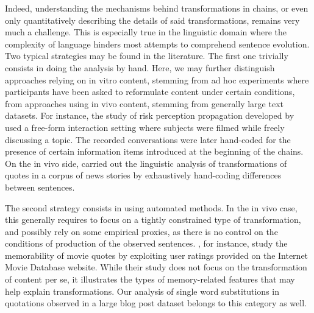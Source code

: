 Indeed, understanding the mechanisms behind transformations in chains, or even only quantitatively describing the details of said transformations, remains very much a challenge.  This is especially true in the linguistic domain where the complexity of language hinders most attempts to comprehend sentence evolution.  Two typical strategies may be found in the literature. The first one trivially consists in doing the analysis by hand.  Here, we may further distinguish approaches relying on in vitro content, stemming from ad hoc experiments where participants have been asked to reformulate content under certain conditions, from approaches using in vivo content, stemming from generally large text datasets.
For instance, the study of risk perception propagation developed by \textcite{moussaid_amplification_2015} used a free-form interaction setting where subjects were filmed while freely discussing a topic. The recorded conversations were later hand-coded for the presence of certain information items introduced at the beginning of the chains. On the in vivo side, \textcite{lauf_analyzing_2013} carried out the linguistic analysis of transformations of quotes in a corpus of news stories by exhaustively hand-coding differences between sentences.

The second strategy consists in using automated methods.  In the in vivo case, this generally requires to focus on a tightly constrained type of transformation, and possibly rely on some empirical proxies, as there is no control on the conditions of production of the observed sentences. %
\textcite{danescu-niculescu-mizil_you_2012}, for instance, study the memorability of movie quotes by exploiting user ratings provided on the Internet Movie Database website. While their study does not focus on the transformation of content per se, it illustrates the types of memory-related features that %
may help explain transformations. Our analysis of single word substitutions in quotations observed in a large blog post dataset \autocite{lerique-2018-semantic-drift} belongs to this category as well.

